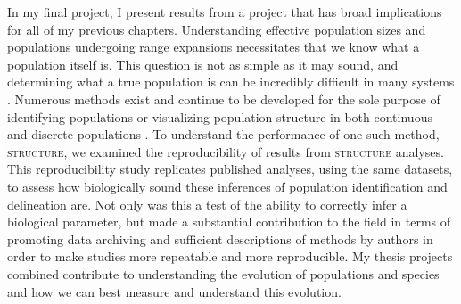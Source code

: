 In my final project,  I present results from a project that has broad implications for all of my previous chapters. Understanding effective population sizes and populations undergoing range expansions necessitates that we know what a population itself is. This question is not as simple as it may sound, and determining what a true population is can be incredibly difficult in many systems \citep{Waples:2006}. Numerous methods exist and continue to be developed for the sole purpose of identifying populations or visualizing population structure in both continuous and discrete populations \citep{Pritchard:2000, Falush:2003, Falush:2007, Rosenberg:2004, Petkova:2015, Bradburd:2016}. To understand the performance of one such method, \textsc{structure}, we examined the reproducibility of results from \textsc{structure} analyses. This reproducibility study replicates published analyses, using the same datasets, to assess how biologically sound these inferences of population identification and delineation are. Not only was this a test of the ability to correctly infer a biological parameter, but made a substantial contribution to the field in terms of promoting data archiving and sufficient descriptions of methods by authors in order to make studies more repeatable and more reproducible. My thesis projects combined contribute to understanding the evolution of populations and species and how we can best measure and understand this evolution.







